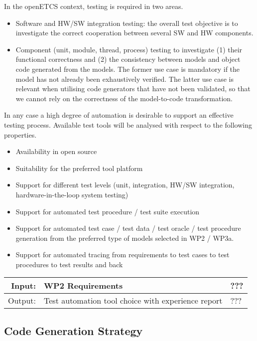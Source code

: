 \documentclass[11pt, a4paper]{article}
\newenvironment{inoutput}
{\vspace{2mm}
\noindent
\begin{tabular}{|r|p{.68\linewidth}|l|}
\hline}
{
\hline
\end{tabular}}
\begin{document}
In the openETCS context, testing is required in two areas.
\begin{itemize}
\item Software and HW/SW integration testing: the overall test objective is to
investigate the correct cooperation between several SW and HW components.
\item Component (unit, module,  thread, process) testing to investigate (1) their functional
correctness 
and (2) the consistency between models and
 object code generated from the models. The former use case is mandatory if the model has not already been exhaustively verified. The latter use case is relevant when utilising code generators 
 that have not been validated, so that we cannot rely on the correctness of the model-to-code transformation.
\end{itemize}
In any case a high degree of automation is desirable to support an effective testing process.
Available test tools will be analysed with respect to the following properties.
\begin{itemize}
\item Availability in open source
\item Suitability for the preferred tool platform 
\item Support for different test levels (unit, integration, HW/SW integration, hardware-in-the-loop system testing)
\item Support for automated test procedure / test suite execution
\item Support for automated test case / test data / test oracle / test procedure generation from
the preferred type of models selected in WP2 / WP3a. 
\item Support for automated tracing from requirements to test cases to test procedures to test results and back
\end{itemize}



\begin{inoutput}
Input: & WP2 Requirements & ??? \\
\hline
Output: & Test automation tool choice with experience report & ??? \\
\end{inoutput}


\subsection{Code Generation Strategy}
\end{document}
